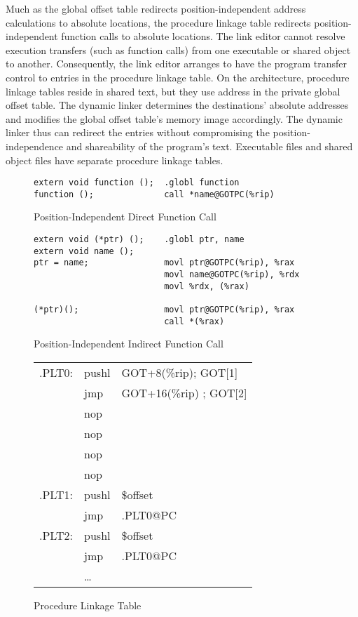 Much as the global offset table redirects position-independent address
calculations to absolute locations, the procedure linkage table
redirects position-independent function calls to absolute locations.
The link editor cannot resolve execution transfers (such as function
calls) from one executable or shared object to another.  Consequently,
the link editor arranges to have the program transfer control to
entries in the procedure linkage table.  On the \xARCH architecture,
procedure linkage tables reside in shared text, but they use address
in the private global offset table.  The dynamic linker determines the
destinations' absolute addresses and modifies the global offset
table's memory image accordingly.  The dynamic linker thus can
redirect the entries without compromising the position-independence
and shareability of the program's text.  Executable files and shared
object files have separate procedure linkage tables.  

\begin{figure}[H]
\caption{Position-Independent Direct Function Call}
\begin{verbatim}
extern void function ();  .globl function
function ();              call *name@GOTPC(%rip)
\end{verbatim}
\end{figure}


\begin{figure}[H]
\caption{Position-Independent Indirect Function Call}
\begin{verbatim}
extern void (*ptr) ();    .globl ptr, name
extern void name ();
ptr = name;               movl ptr@GOTPC(%rip), %rax
                          movl name@GOTPC(%rip), %rdx
                          movl %rdx, (%rax)

(*ptr)();                 movl ptr@GOTPC(%rip), %rax
                          call *(%rax)
\end{verbatim}
\end{figure}


\begin{figure}[H]
\caption{Procedure Linkage Table}
\begin{tabular}{lll}
.PLT0: & pushl & GOT+8(\%rip); GOT[1]\\
& jmp &GOT+16(\%rip) ; GOT[2] \\
& nop & \\
& nop & \\
& nop & \\
& nop & \\
.PLT1: & pushl & \$offset \\
&jmp &.PLT0@PC \\
.PLT2: &pushl & \$offset \\
& jmp & .PLT0@PC \\
&\dots\\
\end{tabular}
\end{figure}


